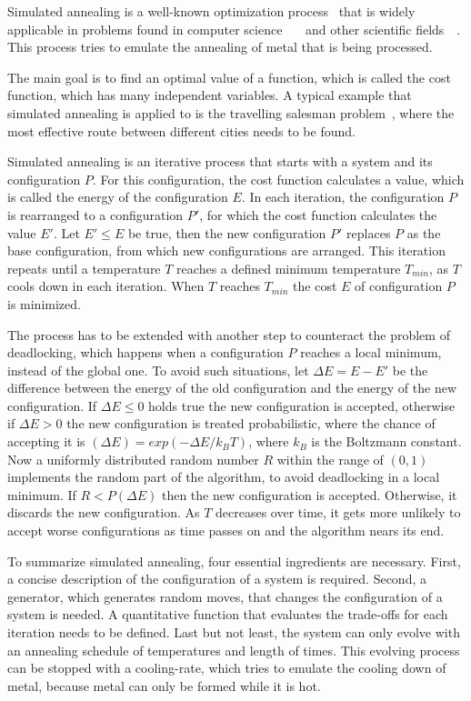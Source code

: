 \documentclass[draft,final]{vutinfth} %
\begin{document}
Simulated annealing is a well-known optimization process~\cite{kirkpatrick1983optimization} that is widely applicable in problems found in computer science~\cite{goffe1994global}~\cite{dekkers1991global}~\cite{brooks1995optimization} and other scientific fields~\cite{pannetier1990prediction}~\cite{sutter1995automated}. This process tries to emulate the annealing of metal that is being processed.

The main goal is to find an optimal value of a function, which is called the cost function, which has many independent variables. A typical example that simulated annealing is applied to is the travelling salesman problem~\cite{malek1989serial}, where the most effective route between different cities needs to be found. 

Simulated annealing is an iterative process that starts with a system and its configuration $P$. For this configuration, the cost function calculates a value, which is called the energy of the configuration $E$. In each iteration, the configuration $P$ is rearranged to a configuration $P'$, for which the cost function calculates the value $E'$. Let $E' \leq E$ be true, then the new configuration $P'$ replaces $P$ as the base configuration, from which new configurations are arranged. This iteration repeats until a temperature $T$ reaches a defined minimum temperature $T_{min}$, as $T$ cools down in each iteration. When $T$ reaches $T_{min}$ the cost $E$ of configuration $P$ is minimized.

The process has to be extended with another step to counteract the problem of deadlocking, which happens when a configuration $P$ reaches a local minimum, instead of the global one. To avoid such situations, let $\Delta E = E - E'$ be the difference between the energy of the old configuration and the energy of the new configuration. If $\Delta E \leq 0$ holds true the new configuration is accepted, otherwise if $\Delta E > 0$ the new configuration is treated probabilistic, where the chance of accepting it is $(\Delta E) = exp(-\Delta E / k_B T)$, where $k_B$ is the Boltzmann constant. Now a uniformly distributed random number $R$ within the range of $(0,1)$ implements the random part of the algorithm, to avoid deadlocking in a local minimum. If $R < P(\Delta E)$ then the new configuration is accepted. Otherwise, it discards the new configuration. As $T$ decreases over time, it gets more unlikely to accept worse configurations as time passes on and the algorithm nears its end.

To summarize simulated annealing, four essential ingredients are necessary. First, a concise description of the configuration of a system is required. Second, a generator, which generates random moves, that changes the configuration of a system is needed. A quantitative function that evaluates the trade-offs for each iteration needs to be defined. Last but not least, the system can only evolve with an annealing schedule of temperatures and length of times. This evolving process can be stopped with a cooling-rate, which tries to emulate the cooling down of metal, because metal can only be formed while it is hot.
\end{document}
